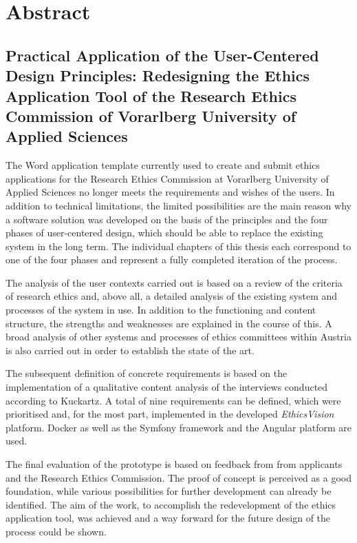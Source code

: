 \documentclass[a4paper,12pt,twoside]{scrreprt}
\begin{document}
\newpage
{}
\section*{Abstract}
\label{sec:abstract-en}

\subsection*{Practical Application of the User-Centered Design Principles: Redesigning the Ethics Application Tool of the Research Ethics Commission of Vorarlberg University of Applied Sciences}

The Word application template currently used to create and submit ethics applications for the Research Ethics Commission at Vorarlberg University of Applied Sciences no longer meets the requirements and wishes of the users. In addition to technical limitations, the limited possibilities are the main reason why a software solution was developed on the basis of the principles and the four phases of user-centered design, which should be able to replace the existing system in the long term. The individual chapters of this thesis each correspond to one of the four phases and represent a fully completed iteration of the process.

\smallskip

The analysis of the user contexts carried out is based on a review of the criteria of research ethics and, above all, a detailed analysis of the existing system and processes of the system in use. In addition to the functioning and content structure, the strengths and weaknesses are explained in the course of this. A broad analysis of other systems and processes of ethics committees within Austria is also carried out in order to establish the state of the art.

\smallskip

The subsequent definition of concrete requirements is based on the implementation of a qualitative content analysis of the interviews conducted according to Kuckartz. A total of nine requirements can be defined, which were prioritised and, for the most part, implemented in the developed \textit{EthicsVision} platform. Docker as well as the Symfony framework and the Angular platform are used.

\smallskip

The final evaluation of the prototype is based on feedback from from applicants and the Research Ethics Commission. The proof of concept is perceived as a good foundation, while various possibilities for further development can already be identified. The aim of the work, to accomplish the redevelopment of the ethics application tool, was achieved and a way forward for the future design of the process could be shown.
\end{document}
